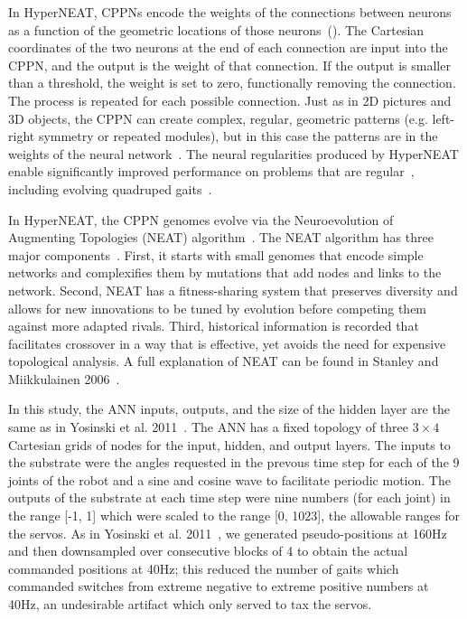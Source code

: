 In HyperNEAT, CPPNs encode the weights of the connections between neurons as a function of the geometric locations of those neurons~(). The Cartesian coordinates of the two neurons at the end of each connection are input into the CPPN, and the output is the weight of that connection. If the output is smaller than a threshold, the weight is set to zero, functionally removing the connection. The process is repeated for each possible connection. Just as in 2D pictures and 3D objects, the CPPN can create complex, regular, geometric patterns (e.g. left-right symmetry or repeated modules), but in this case the patterns are in the weights of the neural network~\cite{clune2011performance}. The neural regularities produced by HyperNEAT enable significantly improved performance on problems that are regular~\cite{clune2011performance,stanley2009hypercube}, including evolving quadruped gaits~\cite{clune2011performance,clune2009evolving,clune2009sensitivity}. 

In HyperNEAT, the CPPN genomes evolve via the Neuroevolution of Augmenting Topologies (NEAT) algorithm~\cite{stanley2006exploiting}. 
The NEAT algorithm has three major components~\cite{stanley2006exploiting}. 
First, it starts with small genomes that encode simple networks and complexifies them by mutations that add nodes and links to the network. Second, NEAT has a fitness-sharing system that preserves diversity and allows for new innovations to be tuned by evolution before competing them against more adapted rivals. 
Third, historical information is recorded that facilitates crossover in a way that is effective, yet avoids the need for expensive topological analysis. A full explanation of NEAT can be found in Stanley and Miikkulainen 2006~\cite{stanley2006exploiting}. 

In this study, the ANN inputs, outputs, and the size of the hidden layer are the same as in Yosinski et al. 2011~\cite{yos:clune}. 
The ANN has a fixed topology of three \begin{math}3\times4\end{math} Cartesian grids of nodes for the input, hidden, and output layers. 
The inputs to the substrate were the angles requested in the prevous time step for each of the 9 joints of the robot and a sine and cosine wave to facilitate periodic motion. 
The outputs of the substrate at each time step were nine numbers (for each joint) in the range [-1, 1] which were scaled to the range [0, 1023], the allowable ranges for the servos. 
As in Yosinski et al. 2011~\cite{yos:clune}, we generated pseudo-positions at 160Hz and then downsampled over consecutive blocks of 4 to obtain the actual commanded positions at 40Hz; this reduced the number of gaits which commanded switches from extreme negative to extreme positive numbers at 40Hz, an undesirable artifact which only served to tax the servos.



